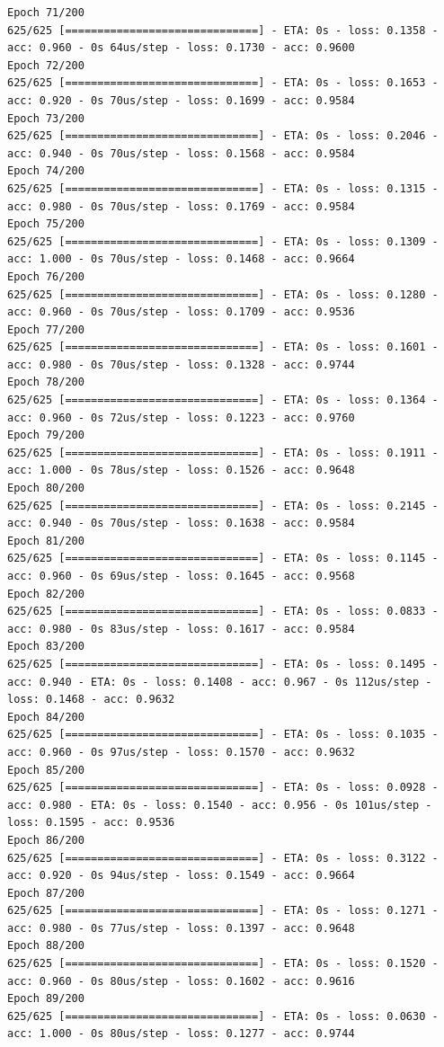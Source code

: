 \documentclass[11pt]{article}
\begin{document}
\begin{Verbatim}[commandchars=\\\{\}]
Epoch 71/200
625/625 [==============================] - ETA: 0s - loss: 0.1358 - acc: 0.960 - 0s 64us/step - loss: 0.1730 - acc: 0.9600
Epoch 72/200
625/625 [==============================] - ETA: 0s - loss: 0.1653 - acc: 0.920 - 0s 70us/step - loss: 0.1699 - acc: 0.9584
Epoch 73/200
625/625 [==============================] - ETA: 0s - loss: 0.2046 - acc: 0.940 - 0s 70us/step - loss: 0.1568 - acc: 0.9584
Epoch 74/200
625/625 [==============================] - ETA: 0s - loss: 0.1315 - acc: 0.980 - 0s 70us/step - loss: 0.1769 - acc: 0.9584
Epoch 75/200
625/625 [==============================] - ETA: 0s - loss: 0.1309 - acc: 1.000 - 0s 70us/step - loss: 0.1468 - acc: 0.9664
Epoch 76/200
625/625 [==============================] - ETA: 0s - loss: 0.1280 - acc: 0.960 - 0s 70us/step - loss: 0.1709 - acc: 0.9536
Epoch 77/200
625/625 [==============================] - ETA: 0s - loss: 0.1601 - acc: 0.980 - 0s 70us/step - loss: 0.1328 - acc: 0.9744
Epoch 78/200
625/625 [==============================] - ETA: 0s - loss: 0.1364 - acc: 0.960 - 0s 72us/step - loss: 0.1223 - acc: 0.9760
Epoch 79/200
625/625 [==============================] - ETA: 0s - loss: 0.1911 - acc: 1.000 - 0s 78us/step - loss: 0.1526 - acc: 0.9648
Epoch 80/200
625/625 [==============================] - ETA: 0s - loss: 0.2145 - acc: 0.940 - 0s 70us/step - loss: 0.1638 - acc: 0.9584
Epoch 81/200
625/625 [==============================] - ETA: 0s - loss: 0.1145 - acc: 0.960 - 0s 69us/step - loss: 0.1645 - acc: 0.9568
Epoch 82/200
625/625 [==============================] - ETA: 0s - loss: 0.0833 - acc: 0.980 - 0s 83us/step - loss: 0.1617 - acc: 0.9584
Epoch 83/200
625/625 [==============================] - ETA: 0s - loss: 0.1495 - acc: 0.940 - ETA: 0s - loss: 0.1408 - acc: 0.967 - 0s 112us/step - loss: 0.1468 - acc: 0.9632
Epoch 84/200
625/625 [==============================] - ETA: 0s - loss: 0.1035 - acc: 0.960 - 0s 97us/step - loss: 0.1570 - acc: 0.9632
Epoch 85/200
625/625 [==============================] - ETA: 0s - loss: 0.0928 - acc: 0.980 - ETA: 0s - loss: 0.1540 - acc: 0.956 - 0s 101us/step - loss: 0.1595 - acc: 0.9536
Epoch 86/200
625/625 [==============================] - ETA: 0s - loss: 0.3122 - acc: 0.920 - 0s 94us/step - loss: 0.1549 - acc: 0.9664
Epoch 87/200
625/625 [==============================] - ETA: 0s - loss: 0.1271 - acc: 0.980 - 0s 77us/step - loss: 0.1397 - acc: 0.9648
Epoch 88/200
625/625 [==============================] - ETA: 0s - loss: 0.1520 - acc: 0.960 - 0s 80us/step - loss: 0.1602 - acc: 0.9616
Epoch 89/200
625/625 [==============================] - ETA: 0s - loss: 0.0630 - acc: 1.000 - 0s 80us/step - loss: 0.1277 - acc: 0.9744

\end{Verbatim}
\end{document}
